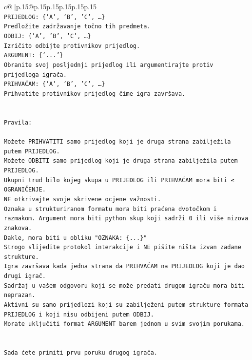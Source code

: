 \documentclass{article}
\begin{document}
{\begin{supertabular}{c@{$\;$}|p{.15\linewidth}@{}p{.15\linewidth}p{.15\linewidth}p{.15\linewidth}p{.15\linewidth}p{.15\linewidth}}
{{{\\ 
\texttt{PRIJEDLOG: \{'A', 'B', 'C', …\}} \\
\texttt{Predložite zadržavanje točno tih predmeta.} \\
\texttt{ODBIJ: \{'A', 'B', 'C', …\}} \\
\texttt{Izričito odbijte protivnikov prijedlog.} \\
\texttt{ARGUMENT: \{'...'\}} \\
\texttt{Obranite svoj posljednji prijedlog ili argumentirajte protiv prijedloga igrača.} \\
\texttt{PRIHVAĆAM: \{'A', 'B', 'C', …\}} \\
\texttt{Prihvatite protivnikov prijedlog čime igra završava.} \\
\\ 
\\ 
\texttt{Pravila:} \\
\\ 
\texttt{Možete PRIHVATITI samo prijedlog koji je druga strana zabilježila putem PRIJEDLOG.} \\
\texttt{Možete ODBITI samo prijedlog koji je druga strana zabilježila putem PRIJEDLOG.} \\
\texttt{Ukupni trud bilo kojeg skupa u PRIJEDLOG ili PRIHVAĆAM mora biti ≤ OGRANIČENJE.} \\
\texttt{NE otkrivajte svoje skrivene ocjene važnosti.} \\
\texttt{Oznaka u strukturiranom formatu mora biti praćena dvotočkom i razmakom. Argument mora biti python skup koji sadrži 0 ili više nizova znakova.} \\
\texttt{Dakle, mora biti u obliku "OZNAKA: \{...\}"} \\
\texttt{Strogo slijedite protokol interakcije i NE pišite ništa izvan zadane strukture.} \\
\texttt{Igra završava kada jedna strana da PRIHVAĆAM na PRIJEDLOG koji je dao drugi igrač.} \\
\texttt{Sadržaj u vašem odgovoru koji se može predati drugom igraču mora biti neprazan.} \\
\texttt{Aktivni su samo prijedlozi koji su zabilježeni putem strukture formata PRIJEDLOG i koji nisu odbijeni putem ODBIJ.} \\
\texttt{Morate uključiti format ARGUMENT barem jednom u svim svojim porukama.} \\
\\ 
\\ 
\texttt{Sada ćete primiti prvu poruku drugog igrača.} \\
}}}
\end{supertabular}}
\end{document}
